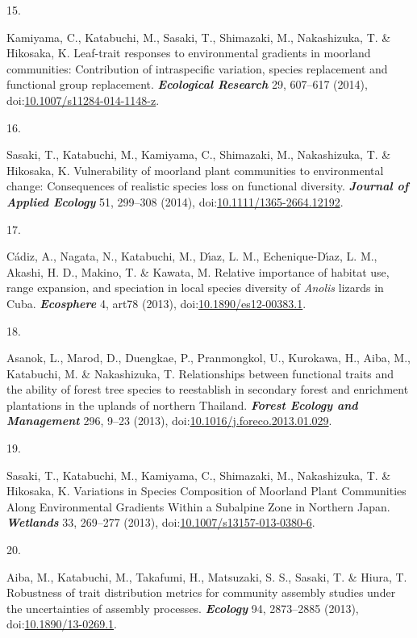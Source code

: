 \documentclass[
]{article}
\newlength{\cslhangindent}
\newlength{\csllabelwidth}
\newlength{\cslentryspacingunit} %
\newenvironment{CSLReferences}[2] %
 {%
  \setlength{\parindent}{0pt}
  \ifodd #1
  \let\oldpar\par
  \def\par{\hangindent=\cslhangindent\oldpar}
  \fi
  \setlength{\parskip}{#2\cslentryspacingunit}
 }%
 {}
\newcommand{\CSLLeftMargin}[1]{\parbox[t]{\csllabelwidth}{#1}}
\newcommand{\CSLRightInline}[1]{\parbox[t]{\linewidth - \csllabelwidth}{#1}\break}
\begin{document}
\begin{CSLReferences}{0}{0}
\leavevmode{}%
\CSLLeftMargin{15. }
\CSLRightInline{Kamiyama, C., Katabuchi, M., Sasaki, T., Shimazaki, M.,
Nakashizuka, T. \& Hikosaka, K. Leaf-trait responses to environmental
gradients in moorland communities: Contribution of intraspecific
variation, species replacement and functional group replacement.
\textbf{\emph{Ecological Research}} 29, 607--617 (2014),
doi:\href{https://doi.org/10.1007/s11284-014-1148-z}{10.1007/s11284-014-1148-z}.}

\leavevmode{}%
\CSLLeftMargin{16. }
\CSLRightInline{Sasaki, T., Katabuchi, M., Kamiyama, C., Shimazaki, M.,
Nakashizuka, T. \& Hikosaka, K. Vulnerability of moorland plant
communities to environmental change: Consequences of realistic species
loss on functional diversity. \textbf{\emph{Journal of Applied Ecology}}
51, 299--308 (2014),
doi:\href{https://doi.org/10.1111/1365-2664.12192}{10.1111/1365-2664.12192}.}

\leavevmode{}%
\CSLLeftMargin{17. }
\CSLRightInline{Cádiz, A., Nagata, N., Katabuchi, M., Dı́az, L. M.,
Echenique-Dı́az, L. M., Akashi, H. D., Makino, T. \& Kawata, M. Relative
importance of habitat use, range expansion, and speciation in local
species diversity of {\emph{Anolis}} lizards in {Cuba}.
\textbf{\emph{Ecosphere}} 4, art78 (2013),
doi:\href{https://doi.org/10.1890/es12-00383.1}{10.1890/es12-00383.1}.}

\leavevmode{}%
\CSLLeftMargin{18. }
\CSLRightInline{Asanok, L., Marod, D., Duengkae, P., Pranmongkol, U.,
Kurokawa, H., Aiba, M., Katabuchi, M. \& Nakashizuka, T. {Relationships
between functional traits and the ability of forest tree species to
reestablish in secondary forest and enrichment plantations in the
uplands of northern Thailand}. \textbf{\emph{Forest Ecology and
Management}} 296, 9--23 (2013),
doi:\href{https://doi.org/10.1016/j.foreco.2013.01.029}{10.1016/j.foreco.2013.01.029}.}

\leavevmode{}%
\CSLLeftMargin{19. }
\CSLRightInline{Sasaki, T., Katabuchi, M., Kamiyama, C., Shimazaki, M.,
Nakashizuka, T. \& Hikosaka, K. {Variations in Species Composition of
Moorland Plant Communities Along Environmental Gradients Within a
Subalpine Zone in Northern Japan}. \textbf{\emph{Wetlands}} 33, 269--277
(2013),
doi:\href{https://doi.org/10.1007/s13157-013-0380-6}{10.1007/s13157-013-0380-6}.}

\leavevmode{}%
\CSLLeftMargin{20. }
\CSLRightInline{Aiba, M., Katabuchi, M., Takafumi, H., Matsuzaki, S. S.,
Sasaki, T. \& Hiura, T. Robustness of trait distribution metrics for
community assembly studies under the uncertainties of assembly
processes. \textbf{\emph{Ecology}} 94, 2873--2885 (2013),
doi:\href{https://doi.org/10.1890/13-0269.1}{10.1890/13-0269.1}.}


\end{CSLReferences}
\end{document}
